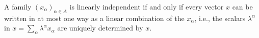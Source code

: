 A family $(x_\alpha)_{\alpha \in A}$ is linearly independent if and only if every vector $x$ can be written in at most one way as a linear combination of the $x_\alpha$, i.e., the scalars $\lambda^\alpha$ in $x = \sum_\alpha \lambda^\alpha x_\alpha$ are uniquely determined by $x$.
